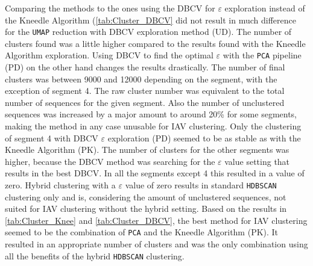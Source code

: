 Comparing the methods to the ones using the \gls{DBCV} for $\varepsilon$ exploration instead of the Kneedle Algorithm (\autoref{tab:Cluster_DBCV} did not result in much difference for the \texttt{UMAP} reduction with \gls{DBCV} exploration method (UD). The number of clusters found was a little higher compared to the results found with the Kneedle Algorithm exploration. Using \gls{DBCV} to find the optimal $\varepsilon$ with the \texttt{PCA} pipeline (PD) on the other hand changes the results drastically. The number of final clusters was between 9000 and 12000 depending on the segment, with the exception of segment 4. The raw cluster number was equivalent to the total number of sequences for the given segment. Also the number of unclustered sequences was increased by a major amount to around 20\% for some segments, making the method in any case unusable for \gls{IAV} clustering. Only the clustering of segment 4 with \gls{DBCV} $\varepsilon$ exploration (PD) seemed to be as stable as with the Kneedle Algorithm (PK). The number of clusters for the other segments was higher, because the \gls{DBCV} method was searching for the $\varepsilon$ value setting that results in the best \gls{DBCV}. In all the segments except 4 this resulted in a value of zero. Hybrid clustering with a $\varepsilon$ value of zero results in standard \texttt{HDBSCAN} clustering only and is, considering the amount of unclustered sequences, not suited for \gls{IAV} clustering without the hybrid setting. Based on the results in \autoref{tab:Cluster_Knee} and \autoref{tab:Cluster_DBCV}, the best method for \gls{IAV} clustering seemed to be the combination of \texttt{PCA} and the Kneedle Algorithm (PK). It resulted in an appropriate number of clusters and was the only combination using all the benefits of the hybrid \texttt{HDBSCAN} clustering. 

